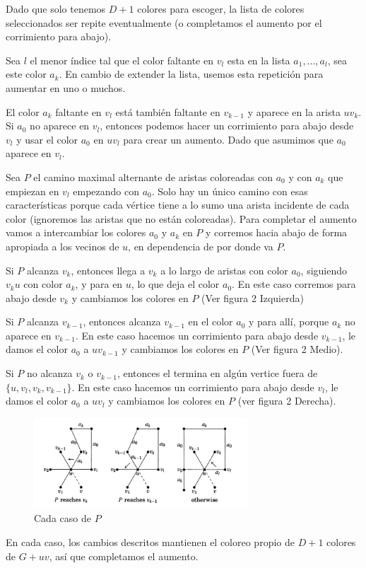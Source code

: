 \documentclass[a4paper]{article}
\begin{document}
Dado que solo tenemos $D + 1$ colores para escoger, la lista de colores seleccionados ser repite eventualmente (o completamos el aumento por el corrimiento para abajo).

Sea $l$ el menor \'indice tal que el color faltante en $v_l$ esta en la lista $a_1, ..., a_l$, sea este color $a_k$. En cambio de extender la lista, usemos esta repetici\'on para aumentar en uno o muchos.

El color $a_k$ faltante en $v_l$ est\'a tambi\'en faltante en $v_{k-1}$ y aparece en la arista $uv_k$. Si $a_0$ no aparece en $v_l$, entonces podemos hacer un corrimiento para abajo desde $v_l$ y usar el color $a_0$ en $uv_l$ para crear un aumento. Dado que asumimos que $a_0$ aparece en $v_l$.

Sea $P$ el camino maximal alternante de aristas coloreadas con $a_0$ y con $a_k$ que empiezan en $v_l$ empezando con $a_0$. Solo hay un \'unico camino con esas caracter\'isticas porque cada v\'ertice tiene a lo sumo una arista incidente de cada color (ignoremos las aristas que no est\'an coloreadas). Para completar el aumento vamos a intercambiar los colores $a_0$ y $a_k$ en $P$ y corremos hacia abajo de forma apropiada a los vecinos de $u$, en dependencia de por donde va $P$.

Si $P$ alcanza $v_k$, entonces llega a $v_k$ a lo largo de aristas con color $a_0$, siguiendo $v_ku$ con color $a_k$, y para en $u$, lo que deja el color $a_0$. En este caso corremos para abajo desde $v_k$ y cambiamos los colores en $P$ (Ver figura 2 Izquierda)

Si $P$ alcanza $v_{k-1}$, entonces alcanza $v_{k-1}$ en el color $a_0$ y para all\'i, porque $a_k$ no aparece en $v_{k-1}$. En este caso hacemos un corrimiento para abajo desde $v_{k-1}$, le damos el color $a_0$ a $uv_{k-1}$ y cambiamos los colores en $P$ (Ver figura 2 Medio).

Si $P$ no alcanza $v_k$ o $v_{k-1}$, entonces el termina en alg\'un vertice fuera de $\{u, v_l, v_k, v_{k-1}\}$. En este caso hacemos un corrimiento para abajo desde $v_l$, le damos el color $a_0$ a $uv_l$ y cambiamos los colores en $P$ (ver figura 2 Derecha).
\begin{figure}
    \begin{center}
        \includegraphics[width=8cm]{image2.png}
        \caption{Cada caso de $P$} 
    \end{center}
\end{figure}
En cada caso, los cambios descritos mantienen el coloreo propio de $D+1$ colores de $G + uv$, as\'i que completamos el aumento.
\end{document}

